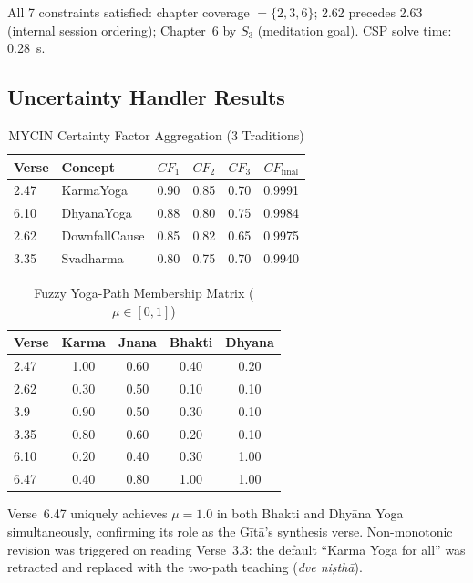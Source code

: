\documentclass[conference]{IEEEtran}
\begin{document}
All 7 constraints satisfied: chapter coverage $= \{2, 3, 6\}$; 2.62
precedes 2.63 (internal session ordering); Chapter~6 by $S_3$ (meditation
goal). CSP solve time: 0.28~s.

\subsection{Uncertainty Handler Results}

\begin{table}[htbp]
\caption{MYCIN Certainty Factor Aggregation (3 Traditions)}
\label{tab:mycin}
\centering
\begin{tabular}{llrrrr}
\toprule
\textbf{Verse} & \textbf{Concept} & $CF_1$ & $CF_2$ & $CF_3$ & $CF_\text{final}$ \\
\midrule
2.47 & KarmaYoga     & 0.90 & 0.85 & 0.70 & 0.9991 \\
6.10 & DhyanaYoga    & 0.88 & 0.80 & 0.75 & 0.9984 \\
2.62 & DownfallCause & 0.85 & 0.82 & 0.65 & 0.9975 \\
3.35 & Svadharma     & 0.80 & 0.75 & 0.70 & 0.9940 \\
\bottomrule
\end{tabular}
\end{table}

\begin{table}[htbp]
\caption{Fuzzy Yoga-Path Membership Matrix ($\mu \in [0,1]$)}
\label{tab:fuzzy}
\centering
\small
\begin{tabular}{lcccc}
\toprule
\textbf{Verse} & \textbf{Karma} & \textbf{Jnana} & \textbf{Bhakti} & \textbf{Dhyana} \\
\midrule
2.47 & 1.00 & 0.60 & 0.40 & 0.20 \\
2.62 & 0.30 & 0.50 & 0.10 & 0.10 \\
3.9  & 0.90 & 0.50 & 0.30 & 0.10 \\
3.35 & 0.80 & 0.60 & 0.20 & 0.10 \\
6.10 & 0.20 & 0.40 & 0.30 & 1.00 \\
6.47 & 0.40 & 0.80 & 1.00 & 1.00 \\
\bottomrule
\end{tabular}
\end{table}

Verse~6.47 uniquely achieves $\mu = 1.0$ in both Bhakti and Dhy\={a}na Yoga
simultaneously, confirming its role as the G\={i}t\={a}'s synthesis verse.
Non-monotonic revision was triggered on reading Verse~3.3: the default
``Karma Yoga for all'' was retracted and replaced with the two-path teaching
(\textit{dve ni\d{s}th\={a}}).
\end{document}
